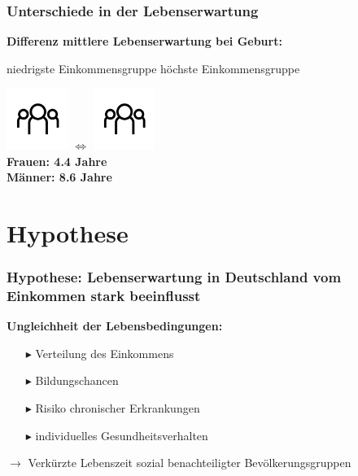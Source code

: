 \documentclass{beamer}
\begin{document}
\begin{frame}
 \frametitle{Unterschiede in der Lebenserwartung}
\textbf{Differenz mittlere Lebenserwartung bei Geburt:}

niedrigste Einkommensgruppe \hfill höchste Einkommensgruppe

\hspace{1.5cm}\includegraphics[height=2cm]{Personen}\hspace{2cm} 
$\Longleftrightarrow$ \hspace{2cm}\includegraphics[height=2cm]{Personen}\\
\vspace{0.5cm}
\hspace{4.3cm} \textbf{Frauen: 4.4 Jahre}\\
\hspace{4.3cm} \textbf{Männer: 8.6 Jahre}
     
    
\end{frame}


\section{Hypothese}
\begin{frame}
 \frametitle{Hypothese: Lebenserwartung in Deutschland vom Einkommen stark beeinflusst}
 \textbf{Ungleichheit der Lebensbedingungen:}
 \vspace{0.5cm}
 \begin{itemize}
   \item [$\blacktriangleright$] Verteilung des Einkommens
   \item [$\blacktriangleright$] Bildungschancen
   \item [$\blacktriangleright$] Risiko chronischer Erkrankungen
   \item [$\blacktriangleright$] individuelles Gesundheitsverhalten
 \end{itemize}
 \vspace{0.5cm}
 $\rightarrow$ Verkürzte Lebenszeit sozial benachteiligter Bevölkerungsgruppen
 
\end{frame}
\end{document}
